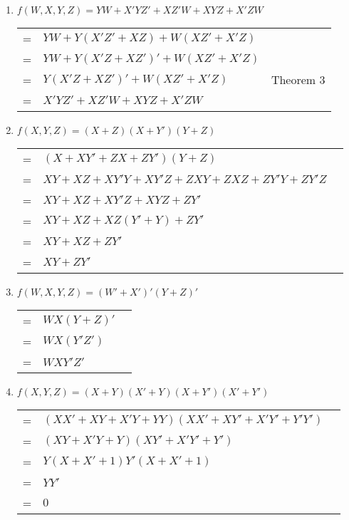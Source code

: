 \documentclass[12pt]{article}
\begin{document}
\begin{enumerate}
    \pagebreak
    
    \item $f(W, X, Y, Z) = YW + X'YZ' + XZ'W + XYZ + X'ZW$ \\
    \begin{tabular}{r l l}
        = & $YW + Y(X'Z' + XZ) + W(XZ' + X'Z)$ & \\
        = & $YW + Y(X'Z + XZ')' + W(XZ' + X'Z)$ & \\
        = & $Y(X'Z + XZ')' + W(XZ' + X'Z)$ & Theorem 3 \\
        = & $X'YZ' + XZ'W + XYZ + X'ZW$ & \\
    \end{tabular}
    
    \pagebreak
    
    \item $f(X, Y, Z) = (X + Z)(X + Y')(Y + Z)$ \\
    \begin{tabular}{r l l}
        = & $(X + XY' + ZX + ZY')(Y + Z)$ & \\
        = & $XY + XZ + XY'Y + XY'Z + ZXY + ZXZ + ZY'Y + ZY'Z$ & \\
        = & $XY + XZ + XY'Z + XYZ + ZY'$ & \\
        = & $XY + XZ + XZ(Y' + Y) + ZY'$ & \\
        = & $XY + XZ + ZY'$ & \\
        = & $XY + ZY'$ & \\
    \end{tabular}
    
    \vspace{20mm}
    
    \item $f(W, X, Y, Z) = (W' + X')' (Y + Z)'$\\
    \begin{tabular}{r l l}
        = & $WX(Y+Z)'$ & \\
        = & $WX(Y'Z')$ & \\
        = & $WXY'Z'$ & \\
    \end{tabular}
    
    \pagebreak
    
    \item $f(X, Y, Z) = (X + Y)(X' + Y)(X + Y')(X' + Y')$ \\
    \begin{tabular}{r l l}
        = & $(XX' + XY + X'Y + YY)(XX' + XY' + X'Y' + Y'Y')$ & \\
        = & $(XY + X'Y + Y)(XY' + X'Y' + Y')$ & \\
        = & $Y(X + X' + 1)Y'(X + X' + 1)$ & \\
        = & $YY'$ & \\
        = & $0$ & \\
    \end{tabular}
    

\end{enumerate}
\end{document}
